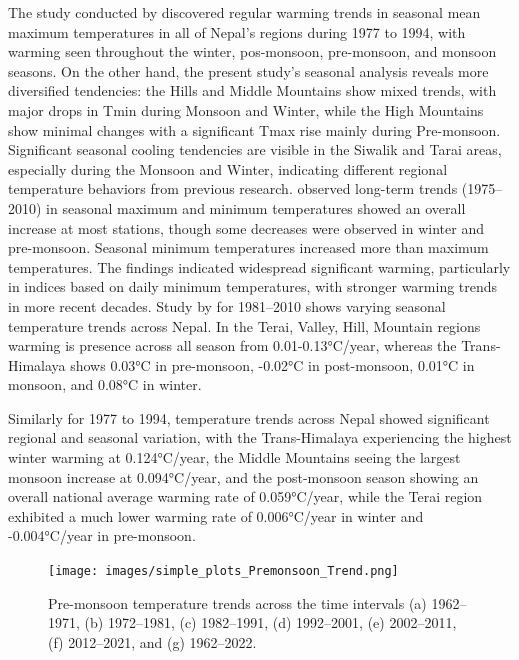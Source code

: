 The study conducted by \citet{shrestha_climate_2011} discovered regular warming trends in seasonal mean maximum temperatures in all of Nepal's regions during 1977 to 1994, with warming seen throughout the winter, pos-monsoon, pre-monsoon, and monsoon seasons. On the other hand, the present study's seasonal analysis reveals more diversified tendencies: the Hills and Middle Mountains show mixed trends, with major drops in Tmin during Monsoon and Winter, while the High Mountains show minimal changes with a significant Tmax rise mainly during Pre-monsoon. Significant seasonal cooling tendencies are visible in the Siwalik and Tarai areas, especially during the Monsoon and Winter, indicating different regional temperature behaviors from previous research. \citet{shrestha_observed_2017} observed long-term trends (1975--2010) in seasonal maximum and minimum temperatures showed an overall increase at most stations, though some decreases were observed in winter and pre-monsoon. Seasonal minimum temperatures increased more than maximum temperatures. The findings indicated widespread significant warming, particularly in indices based on daily minimum temperatures, with stronger warming trends in more recent decades. Study  by \citet{nayava_spatial_2017} for 1981--2010 shows varying seasonal temperature trends across Nepal. In the Terai, Valley, Hill, Mountain regions warming is presence across all season from 0.01-0.13°C/year, whereas the Trans-Himalaya shows 0.03°C in pre-monsoon, -0.02°C in post-monsoon, 0.01°C in monsoon, and 0.08°C in winter.


Similarly \citet{shrestha_maximum_1999} for 1977 to 1994, temperature trends across Nepal showed significant regional and seasonal variation, with the Trans-Himalaya experiencing the highest winter warming at 0.124°C/year, the Middle Mountains seeing the largest monsoon increase at 0.094°C/year, and the post-monsoon season showing an overall national average warming rate of 0.059°C/year, while the Terai region exhibited a much lower warming rate of 0.006°C/year in winter and -0.004°C/year in pre-monsoon.

\begin{figure}[H] 
  \centering
  \texttt{[image: images/simple\_plots\_Premonsoon\_Trend.png]}  
  \caption{Pre-monsoon temperature trends across the time intervals (a) 1962–1971, (b) 1972–1981, (c) 1982–1991, (d) 1992–2001, (e) 2002–2011, (f) 2012–2021, and (g) 1962–2022.} 
  \label{fig:Pre-monsoon temperature trends}  
\end{figure}

